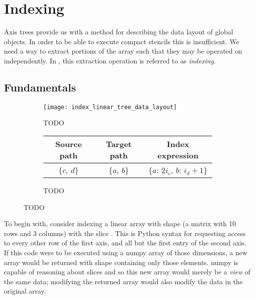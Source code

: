 \documentclass[thesis]{subfiles}
\begin{document}

\chapter{Indexing}

Axis trees provide us with a method for describing the data layout of global objects.
In order to be able to execute compact stencils this is insufficient.
We need a way to extract portions of the array such that they may be operated on independently.
In , this extraction operation is referred to as \textit{indexing}.

\section{Fundamentals}

\begin{figure}
  \centering
  \begin{subfigure}{\textwidth}
    \centering
    \texttt{[image: index\_linear\_tree\_data\_layout]}
    \caption{TODO}
    \label{fig:index_linear_tree_data_layout}
  \end{subfigure}

  \vspace{1em}

  \begin{subfigure}{\textwidth}
    \centering
    \begin{tabular}{c|c|c}
      \textbf{Source path} & \textbf{Target path} & \textbf{Index expression} \\
      \hline
      \{$c$, $d$\} & \{$a$, $b$\} & \{$a$: $2 i_c$, $b$: $i_d+1$\} \\
    \end{tabular}
    \caption{TODO}
    \label{fig:index_linear_tree_exprs}
  \end{subfigure}

  \caption{TODO}
  \label{fig:index_linear_tree_all}
\end{figure}

To begin with, consider indexing a linear array with shape  (a matrix with 10 rows and 3 columns) with the slice \pycode{[::2, 1:]}.
This is Python syntax for requesting access to every other row of the first axis, and all but the first entry of the second axis.
If this code were to be executed using a numpy array of those dimensions, a new array would be returned with shape  containing only those elements.
numpy is capable of reasoning about slices and so this new array would merely be a \textit{view} of the same data; modifying the returned array would also modify the data in the original array.
\end{document}
